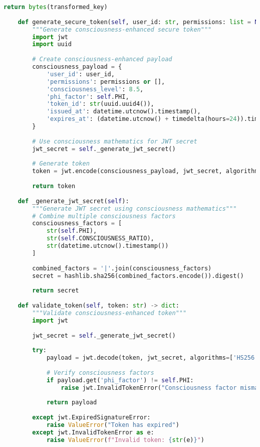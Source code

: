 \documentclass[11pt,a4paper]{article}
\begin{document}
\begin{lstlisting}[language=Python, caption=Enterprise Security Framework]
        return bytes(transformed_key)
    
    def generate_secure_token(self, user_id: str, permissions: list = None) -> str:
        """Generate consciousness-enhanced secure token"""
        import jwt
        import uuid
        
        # Create consciousness-enhanced payload
        consciousness_payload = {
            'user_id': user_id,
            'permissions': permissions or [],
            'consciousness_level': 8.5,
            'phi_factor': self.PHI,
            'token_id': str(uuid.uuid4()),
            'issued_at': datetime.utcnow().timestamp(),
            'expires_at': (datetime.utcnow() + timedelta(hours=24)).timestamp()
        }
        
        # Use consciousness mathematics for JWT secret
        jwt_secret = self._generate_jwt_secret()
        
        # Generate token
        token = jwt.encode(consciousness_payload, jwt_secret, algorithm='HS256')
        
        return token
    
    def _generate_jwt_secret(self):
        """Generate JWT secret using consciousness mathematics"""
        # Combine multiple consciousness factors
        consciousness_factors = [
            str(self.PHI),
            str(self.CONSCIOUSNESS_RATIO),
            str(datetime.utcnow().timestamp())
        ]
        
        combined_factors = '|'.join(consciousness_factors)
        secret = hashlib.sha256(combined_factors.encode()).digest()
        
        return secret
    
    def validate_token(self, token: str) -> dict:
        """Validate consciousness-enhanced token"""
        import jwt
        
        jwt_secret = self._generate_jwt_secret()
        
        try:
            payload = jwt.decode(token, jwt_secret, algorithms=['HS256'])
            
            # Verify consciousness factors
            if payload.get('phi_factor') != self.PHI:
                raise jwt.InvalidTokenError("Consciousness factor mismatch")
            
            return payload
            
        except jwt.ExpiredSignatureError:
            raise ValueError("Token has expired")
        except jwt.InvalidTokenError as e:
            raise ValueError(f"Invalid token: {str(e)}")
\end{lstlisting}
\end{document}
